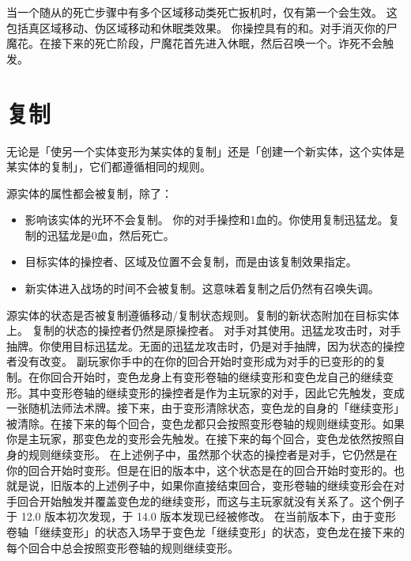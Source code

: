 当一个随从的死亡步骤中有多个区域移动类死亡扳机时，仅有第一个会生效。
\notice 这包括真区域移动、伪区域移动和休眠类效果。
\example 你操控具有的和。对手消灭你的尸魔花。在接下来的死亡阶段，尸魔花首先进入休眠，然后召唤一个。诈死不会触发。

\section{复制}

无论是「使另一个实体变形为某实体的复制」还是「创建一个新实体，这个实体是某实体的复制」，它们都遵循相同的规则。

源实体的属性都会被复制，除了：
\begin{itemize}
    \item 影响该实体的光环不会复制。
        \example 你的对手操控和1血的。你使用复制迅猛龙。复制的迅猛龙是0血，然后死亡。
    \item 目标实体的操控者、区域及位置不会复制，而是由该复制效果指定。
    \item 新实体进入战场的时间不会被复制。这意味着复制之后仍然有召唤失调。
\end{itemize}

源实体的状态是否被复制遵循移动/复制状态规则。复制的新状态附加在目标实体上。
\notice 复制的状态的操控者仍然是原操控者。
\example 对手对其使用。迅猛龙攻击时，对手抽牌。你使用目标迅猛龙。无面的迅猛龙攻击时，仍是对手抽牌，因为状态的操控者没有改变。
\example {}副玩家你手中的在你的回合开始时变形成为对手的已变形的的复制。在你回合开始时，变色龙身上有变形卷轴的继续变形和变色龙自己的继续变形。其中变形卷轴的继续变形的操控者是作为主玩家的对手，因此它先触发，变成一张随机法师法术牌。接下来，由于变形清除状态，变色龙的自身的「继续变形」被清除。在接下来的每个回合，变色龙都只会按照变形卷轴的规则继续变形。如果你是主玩家，那变色龙的变形会先触发。在接下来的每个回合，变色龙依然按照自身的规则继续变形。
\notice {}在上述例子中，虽然那个状态的操控者是对手，它仍然是在你的回合开始时变形。但是在旧的版本中，这个状态是在的回合开始时变形的。也就是说，旧版本的上述例子中，如果你直接结束回合，变形卷轴的继续变形会在对手回合开始触发并覆盖变色龙的继续变形，而这与主玩家就没有关系了。这个例子于 12.0 版本初次发现，于 14.0 版本发现已经被修改。
\notice {}在当前版本下，由于变形卷轴「继续变形」的状态入场早于变色龙「继续变形」的状态，变色龙在接下来的每个回合中总会按照变形卷轴的规则继续变形。

